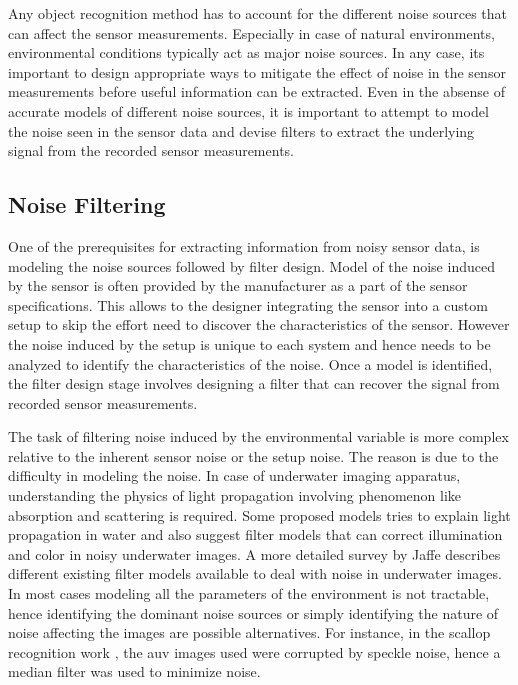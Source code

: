 \documentclass {udthesis}
\begin{document}
Any object recognition method has to account for the different noise sources that can affect the sensor measurements. Especially in case of natural environments, environmental conditions typically act as major noise sources. 
In any case, its important to design appropriate ways to mitigate the effect of noise 
in the sensor measurements before useful information can be extracted. 
Even in the absense of accurate models of different noise sources, it is important to attempt to model the noise seen in the sensor data
and devise filters to extract the underlying signal from the recorded sensor measurements.

\subsection{Noise Filtering}
\label{sec:noise_filters}

One of the prerequisites for extracting information from noisy sensor data, is modeling the noise sources followed by filter design.
Model of the noise induced by the sensor is often provided by the manufacturer as a part of the sensor specifications. 
This allows to the designer integrating the sensor into a custom setup to skip the effort need to discover the characteristics of the sensor. 
However the noise induced by the setup is unique to each system and hence needs to be analyzed to identify the characteristics of the noise.
Once a model is identified, the filter design stage involves designing a filter that can recover the signal from recorded sensor measurements.

The task of filtering noise induced by the environmental variable is more complex relative to the inherent sensor noise or the setup noise.
The reason is due to the difficulty in modeling the noise. In case of underwater imaging apparatus, understanding the physics of 
light propagation involving phenomenon like absorption and scattering is required. Some proposed models \cite{garcia, ahlen} tries to 
explain light propagation in water and also suggest filter models that can correct illumination and color in noisy underwater images. A more detailed survey
by Jaffe \cite{jaffe} describes different existing filter models available to deal with noise in underwater images.
In most cases modeling all the parameters of the environment is not tractable, hence identifying the  dominant noise sources or simply identifying the nature of noise affecting the images are possible alternatives.
For instance, in the scallop recognition work \cite{prasanna_aslo}, the \gls{auv} images used were corrupted by speckle noise,
hence a median filter \cite{despeckle} was used to minimize noise.
\end{document}
